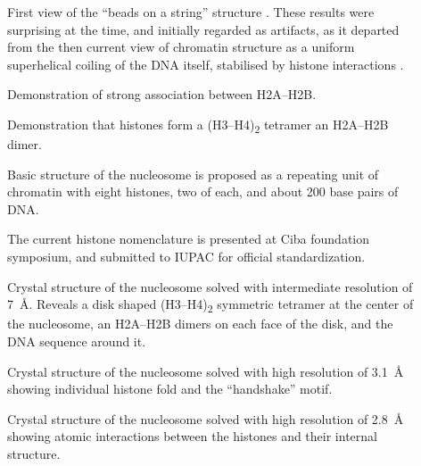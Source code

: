 \begin{description}
        \item[\cite{olins1974-nu-bodies}]
        First view of the ``beads on a string'' structure
        .
        These results were surprising at the time, and initially
        regarded as artifacts, as it departed from the then current
        view of chromatin structure as a uniform superhelical
        coiling of the DNA itself, stabilised by histone interactions
        \citep{pardon-wilkins-1972model}.

        \item[\cite{anna-isenberg-1974-h2a-h2b}]
        Demonstration of strong association between H2A--H2B.

        \item[\cite{kornberg1974-results}]
        Demonstration that histones form a (H3--H4)\textsubscript{2} tetramer
        an H2A--H2B dimer.

        \item[\cite{kornberg1974-model}]
        Basic structure of the nucleosome is proposed as a repeating
        unit of chromatin with eight histones, two of each, and about
        200 base pairs of DNA.

        \item[\cite{bradbury1975-histone-nomenclature}]
        The current histone nomenclature is presented at Ciba foundation
        symposium, and submitted to IUPAC for official standardization.

        \item[\cite{richmond1984-7angstrom}]
        Crystal structure of the nucleosome solved with intermediate
        resolution of \SI{7}{\angstrom}.
        Reveals a disk shaped (H3--H4)\textsubscript{2} symmetric
        tetramer at the center of the nucleosome, an H2A--H2B dimers
        on each face of the disk, and the DNA sequence around it.

        \item[\cite{arents1991-31angstrom}]
        Crystal structure of the nucleosome solved with high
        resolution of \SI{3.1}{\angstrom} showing individual
        histone fold and the ``handshake'' motif.

        \item[\cite{luger1997-28angstrom}]
        Crystal structure of the nucleosome solved with high
        resolution of \SI{2.8}{\angstrom} showing atomic interactions
        between the histones and their internal structure.
      \end{description}


